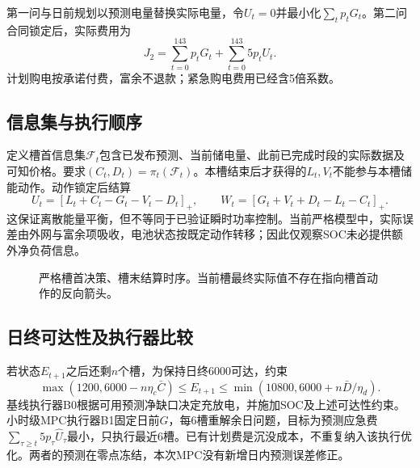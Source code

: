 \documentclass[UTF8,a4paper,zihao=-4,fontset=fandol]{ctexart}
\begin{document}
第一问与日前规划以预测电量替换实际电量，令$U_t=0$并最小化$\sum_t p_tG_t$。第二问合同锁定后，实际费用为
\begin{equation}\label{eq:cost}
J_2=\sum_{t=0}^{143}p_tG_t+\sum_{t=0}^{143}5p_tU_t.
\end{equation}
计划购电按承诺付费，富余不退款；紧急购电费用已经含5倍系数。

\subsection{信息集与执行顺序}
定义槽首信息集$\mathcal F_t$包含已发布预测、当前储电量、此前已完成时段的实际数据及可知价格。要求$(C_t,D_t)=\pi_t(\mathcal F_t)$。本槽结束后才获得的$L_t,V_t$不能参与本槽储能动作。动作锁定后结算
\begin{equation}
U_t=[L_t+C_t-G_t-V_t-D_t]_+,\qquad
W_t=[G_t+V_t+D_t-L_t-C_t]_+.
\end{equation}
这保证离散能量平衡，但不等同于已验证瞬时功率控制。当前严格模型中，实际误差由外网与富余项吸收，电池状态按既定动作转移；因此仅观察SOC未必提供额外净负荷信息。
\begin{figure}[H]\centering
{}
\caption{严格槽首决策、槽末结算时序。当前槽最终实际值不存在指向槽首动作的反向箭头。}
\end{figure}

\subsection{日终可达性及执行器比较}
若状态$E_{t+1}$之后还剩$n$个槽，为保持日终6000可达，约束
\begin{equation}
\max(1200,6000-n\eta_c\bar C)\le E_{t+1}\le
\min(10800,6000+n\bar D/\eta_d).
\end{equation}
基线执行器B0根据可用预测净缺口决定充放电，并施加SOC及上述可达性约束。小时级MPC执行器B1固定日前$G$，每6槽重解余日问题，目标为预测应急费$\sum_{\tau\ge t}5p_\tau\widehat U_\tau$最小，只执行最近6槽。已有计划费是沉没成本，不重复纳入该执行优化。两者的预测在零点冻结，本次MPC没有新增日内预测误差修正。
\end{document}
